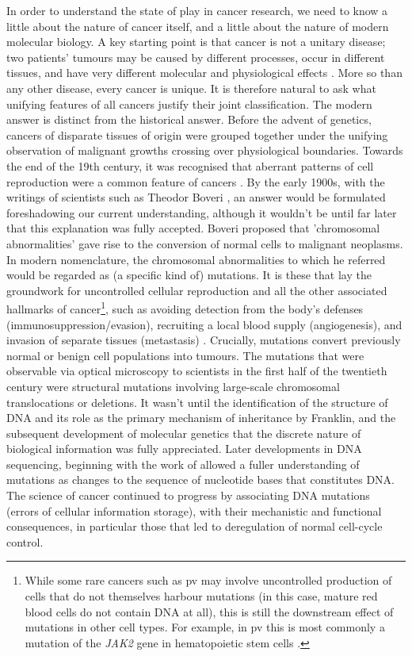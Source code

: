 \documentclass[10pt,twoside,openright]{report}
\begin{document}
In order to understand the state of play in cancer research, we need to know a little about the nature of cancer itself, and a little about the nature of modern molecular biology. A key starting point is that cancer is not a unitary disease;  two patients’ tumours may be caused by different processes, occur in different tissues, and have very different molecular and physiological effects \citep{wittekind_tnm_2016}. More so than any other disease, every cancer is unique. It is therefore natural to ask what unifying features of all cancers justify their joint classification. The modern answer is distinct from the historical answer. Before the advent of genetics, cancers of disparate tissues of origin were grouped together under the unifying observation of malignant growths crossing over physiological boundaries. Towards the end of the 19th century, it was recognised that aberrant patterns of cell reproduction were a common feature of cancers \citep{weinstein_history_2008}. By the early 1900s, with the writings of scientists such as Theodor Boveri \citep[see][for a modern translation]{boveri_concerning_2008}, an answer would be formulated foreshadowing our current understanding, although it wouldn't be until far later that this explanation was fully accepted. Boveri proposed that 'chromosomal abnormalities' gave rise to the conversion of normal cells to malignant neoplasms. In modern nomenclature, the chromosomal abnormalities to which he referred would be regarded as (a specific kind of) mutations. It is these that lay the groundwork for uncontrolled cellular reproduction and all the other associated hallmarks of cancer\footnote{While some rare cancers such as \acrfull{pv} may involve uncontrolled production of cells that do not themselves harbour mutations (in this case, mature red blood cells do not contain DNA at all), this is still the downstream effect of mutations in other cell types. For example, in \acrshort{pv} this is most commonly a mutation of the \textit{JAK2} gene in hematopoietic stem cells \citep{tefferi_jak2_2007}.}, such as avoiding detection from the body's defenses (immunosuppression/evasion), recruiting a local blood supply (angiogenesis), and invasion of separate tissues (metastasis) \citep{hanahan_hallmarks_2011}. Crucially, mutations convert previously normal or benign cell populations into tumours. The mutations that were observable via optical microscopy to scientists in the first half of the twentieth century were structural mutations involving large-scale chromosomal translocations or deletions. It wasn't until the identification of the structure of DNA and its role as the primary mechanism of inheritance by Franklin, \citet{watson_molecular_1953} and the subsequent development of molecular genetics that the discrete nature of biological information was fully appreciated. Later developments in DNA sequencing, beginning with the work of \citet{sanger_dna_1977} allowed a fuller understanding of mutations as changes to the sequence of nucleotide bases that constitutes DNA. The science of cancer continued to progress by associating DNA mutations (errors of cellular information storage), with their mechanistic and functional consequences, in particular those that led to deregulation of normal cell-cycle control.
\end{document}
